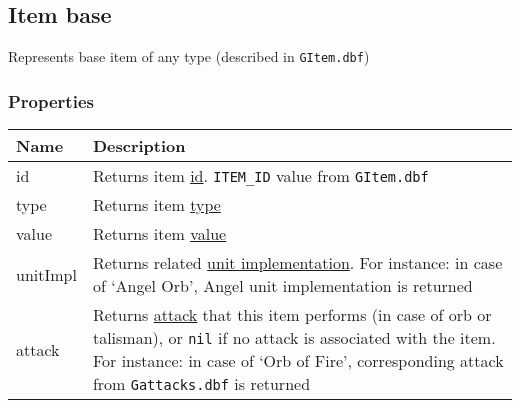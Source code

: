 \subsection{Item base}
\label{ItemBase}
Represents base item of any type (described in \texttt{GItem.dbf})
\subsubsection{Properties}
\begin{center}
\begin{tabularx}{\linewidth}{| l | X |}
\hline
\textbf{Name} & \textbf{Description} \\
\hline
id & Returns item \hyperref[Id]{id}. \texttt{ITEM\_ID} value from \texttt{GItem.dbf}\\
\hline
type & Returns item \hyperref[ItemCategory]{type}\\
\hline
value & Returns item \hyperref[Currency]{value}\\
\hline
unitImpl & Returns related \hyperref[UnitImpl]{unit implementation}. For instance: in case of `Angel Orb', Angel unit implementation is returned\\
\hline
attack & Returns \hyperref[Attack]{attack} that this item performs (in case of orb or talisman), or \texttt{nil} if no attack is associated with the item. For instance: in case of `Orb of Fire', corresponding attack from \texttt{Gattacks.dbf} is returned\\
\hline
\end{tabularx}
\end{center}